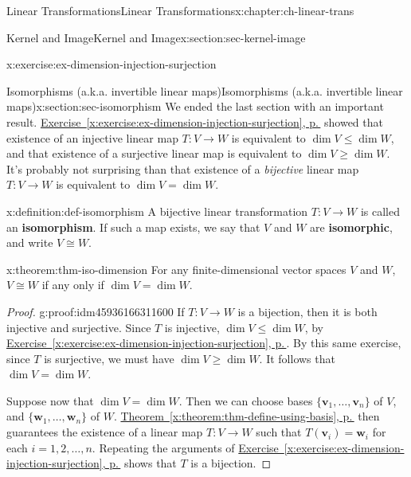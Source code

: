 \documentclass[oneside,10pt,]{book}
\newcommand{\xreffont}{\relax}
\newcommand{\terminology}[1]{\textbf{#1}}
\numberwithin{equation}{section}
\newcommand{\vv}{\mathbf{v}}
\newcommand{\ww}{\mathbf{w}}
\begin{document}
\begin{chapterptx}{Linear Transformations}{}{Linear Transformations}{}{}{x:chapter:ch-linear-trans}
\begin{sectionptx}{Kernel and Image}{}{Kernel and Image}{}{}{x:section:sec-kernel-image}
\begin{inlineexercise}{}{x:exercise:ex-dimension-injection-surjection}
\begin{enumerate}
\end{enumerate}
%
\end{inlineexercise}%
\end{sectionptx}
%
%
\typeout{************************************************}
\typeout{************************************************}
%
\begin{sectionptx}{Isomorphisms (a.k.a. invertible linear maps)}{}{Isomorphisms (a.k.a. invertible linear maps)}{}{}{x:section:sec-isomorphism}
We ended the last section with an important result. \hyperref[x:exercise:ex-dimension-injection-surjection]{Exercise~{\xreffont\ref{x:exercise:ex-dimension-injection-surjection}}, p.\,\pageref{x:exercise:ex-dimension-injection-surjection}} showed that existence of an injective linear map \(T:V\to W\) is equivalent to \(\dim V\leq \dim W\), and that existence of a surjective linear map is equivalent to \(\dim V\geq \dim W\). It's probably not surprising than that existence of a \emph{bijective} linear map \(T:V\to W\) is equivalent to \(\dim V = \dim W\).%
\begin{definition}{}{x:definition:def-isomorphism}%
A bijective linear transformation \(T:V\to W\) is called an \terminology{isomorphism}. If such a map exists, we say that \(V\) and \(W\) are \terminology{isomorphic}, and write \(V\cong W\).%
\end{definition}
\begin{theorem}{}{}{x:theorem:thm-iso-dimension}%
For any finite-dimensional vector spaces \(V\) and \(W\), \(V\cong W\) if any only if \(\dim V = \dim W\).%
\end{theorem}
\begin{proof}{}{g:proof:idm45936166311600}
If \(T:V\to W\) is a bijection, then it is both injective and surjective. Since \(T\) is injective, \(\dim V\leq \dim W\), by \hyperref[x:exercise:ex-dimension-injection-surjection]{Exercise~{\xreffont\ref{x:exercise:ex-dimension-injection-surjection}}, p.\,\pageref{x:exercise:ex-dimension-injection-surjection}}. By this same exercise,  since \(T\) is surjective, we must have \(\dim V\geq \dim W\). It follows that \(\dim V=\dim W\).%
\par
Suppose now that \(\dim V =\dim W\). Then we can choose bases \(\{\vv_1,\ldots, \vv_n\}\) of \(V\), and \(\{\ww_1,\ldots, \ww_n\}\) of \(W\). \hyperref[x:theorem:thm-define-using-basis]{Theorem~{\xreffont\ref{x:theorem:thm-define-using-basis}}, p.\,\pageref{x:theorem:thm-define-using-basis}} then guarantees the existence of a linear map \(T:V\to W\) such that \(T(\vv_i)=\ww_i\) for each \(i=1,2,\ldots, n\). Repeating the arguments of \hyperref[x:exercise:ex-dimension-injection-surjection]{Exercise~{\xreffont\ref{x:exercise:ex-dimension-injection-surjection}}, p.\,\pageref{x:exercise:ex-dimension-injection-surjection}} shows that \(T\) is a bijection.%

\end{proof}
\end{sectionptx}
\end{chapterptx}
\end{document}
